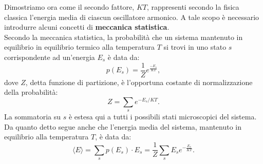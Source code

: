 \documentclass[a4paper,12pt,oneside]{book}
\begin{document}
Dimostriamo ora come il secondo fattore, $KT$, rappresenti secondo la fisica classica l'energia media di ciascun oscillatore armonico. A tale scopo è necessario introdurre alcuni concetti di \textbf{meccanica statistica}.\\
Secondo la meccanica statistica, la probabilità che un sistema mantenuto in equilibrio in equilibrio termico alla temperatura $T$ si trovi in uno stato $s$ corrispondente ad un'energia $E_s$ è data da:
	\begin{equation}
		p(E_s) =\frac{1}{Z}e^{\frac{-E_s}{KT}},
	\end{equation}
dove $Z$, detta funzione di partizione, è l'opportuna costante di normalizzazione della probabilità:
	\begin{equation}
		Z= \sum _s e^{-E_s / KT}.
	\end{equation} 
La sommatoria su $s$ è estesa qui a tutti i possibili stati microscopici del sistema.\\
Da quanto detto segue anche che l'energia media del sistema, mantenuto in equilibrio alla temperatura $T$, è data da:
	\begin{equation}
	\langle E \rangle = \sum _s p(E_s)\cdot E_s = \frac{1}{Z}\sum _s E_s e^{-\frac{E_s}{KT}}.
	\end{equation}
\end{document}
